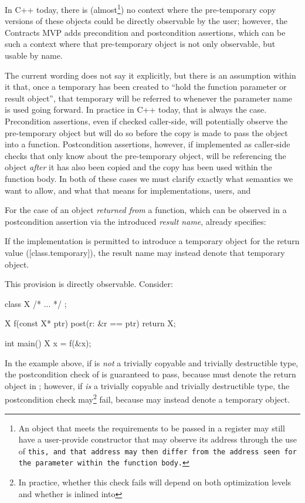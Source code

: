 In C++ today, there is (almost\footnote{An object that meets the requirements to be passed in a register may still have a user-provide constructor that may observe its address through the use of \tt{this}, and that address may then differ from the address seen for the parameter within the function body.}) no context where the pre-temporary copy versions of these objects could be directly observable by the user; however, the Contracts MVP \cite{P2900R10} adds precondition and postcondition assertions, which can be such a context where that pre-temporary object is not only observable, but usable by name.

The current wording does not say it explicitly, but there is an assumption within it that, once a temporary has been created to ``hold the function parameter or result object'', that temporary will be referred to whenever the parameter name is used going forward.   In practice in C++ today, that is always the case.    Precondition assertions, even if checked caller-side, will potentially observe the pre-temporary object but will do so before the copy is made to pass the object into a function.   Postcondition assertions, however, if implemented as caller-side checks that only know about the pre-temporary object, will be referencing the object \emph{after} it has also been copied and the copy has been used within the function body.
In both of these cases we must clarify exactly what semantics we want to allow, and what that means for implementations, users, and 

For the case of an object \emph{returned from} a function, which can be observed in a postcondition assertion via the introduced \emph{result name}, \cite{P2900R10} already specifies:

\begin{adjustwidth}{0.5cm}{0.5cm}
If the implementation is permitted to introduce a temporary object for the return value
([class.temporary]), the result name may instead denote that temporary object.
\end{adjustwidth}

This provision is directly observable. Consider:

\begin{codeblock}
class X { /* ... */ };

X f(const X* ptr) post(r: &r == ptr) {
  return X{};
}

int main() {
  X x = f(&x);
}
\end{codeblock}

In the example above, if  is \emph{not} a trivially copyable and trivially destructible type, the postcondition check of  is guaranteed to pass, because  must denote the return object  in ; however, if  \emph{is} a trivially copyable and trivially destructible type, the postcondition check may\footnote{In practice, whether this check fails will depend on both optimization levels and whether  is inlined into } fail, because  may instead denote a temporary object.

